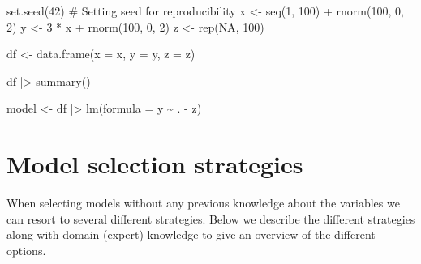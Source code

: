 \documentclass[
  letterpaper,
  DIV=11,
  numbers=noendperiod]{scrreprt}
\newenvironment{Shaded}{\begin{snugshade}}{\end{snugshade}}
\newcommand{\AttributeTok}[1]{\textcolor[rgb]{0.40,0.45,0.13}{#1}}
\newcommand{\CommentTok}[1]{\textcolor[rgb]{0.37,0.37,0.37}{#1}}
\newcommand{\ConstantTok}[1]{\textcolor[rgb]{0.56,0.35,0.01}{#1}}
\newcommand{\DecValTok}[1]{\textcolor[rgb]{0.68,0.00,0.00}{#1}}
\newcommand{\FunctionTok}[1]{\textcolor[rgb]{0.28,0.35,0.67}{#1}}
\newcommand{\NormalTok}[1]{\textcolor[rgb]{0.00,0.23,0.31}{#1}}
\newcommand{\OtherTok}[1]{\textcolor[rgb]{0.00,0.23,0.31}{#1}}
\newcommand{\SpecialCharTok}[1]{\textcolor[rgb]{0.37,0.37,0.37}{#1}}
\begin{document}
\begin{Shaded}
\begin{Highlighting}[]
\FunctionTok{set.seed}\NormalTok{(}\DecValTok{42}\NormalTok{) }\CommentTok{\# Setting seed for reproducibility}
\NormalTok{x }\OtherTok{\textless{}{-}} \FunctionTok{seq}\NormalTok{(}\DecValTok{1}\NormalTok{, }\DecValTok{100}\NormalTok{) }\SpecialCharTok{+} \FunctionTok{rnorm}\NormalTok{(}\DecValTok{100}\NormalTok{, }\DecValTok{0}\NormalTok{, }\DecValTok{2}\NormalTok{)}
\NormalTok{y }\OtherTok{\textless{}{-}} \DecValTok{3} \SpecialCharTok{*}\NormalTok{ x }\SpecialCharTok{+} \FunctionTok{rnorm}\NormalTok{(}\DecValTok{100}\NormalTok{, }\DecValTok{0}\NormalTok{, }\DecValTok{2}\NormalTok{)}
\NormalTok{z }\OtherTok{\textless{}{-}} \FunctionTok{rep}\NormalTok{(}\ConstantTok{NA}\NormalTok{, }\DecValTok{100}\NormalTok{)}

\NormalTok{df }\OtherTok{\textless{}{-}} \FunctionTok{data.frame}\NormalTok{(}\AttributeTok{x =}\NormalTok{ x, }\AttributeTok{y =}\NormalTok{ y, }\AttributeTok{z =}\NormalTok{ z)}

\NormalTok{df }\SpecialCharTok{|\textgreater{}} \FunctionTok{summary}\NormalTok{()}

\NormalTok{model }\OtherTok{\textless{}{-}}\NormalTok{ df }\SpecialCharTok{|\textgreater{}} \FunctionTok{lm}\NormalTok{(}\AttributeTok{formula =}\NormalTok{ y }\SpecialCharTok{\textasciitilde{}}\NormalTok{ . }\SpecialCharTok{{-}}\NormalTok{ z)}
\end{Highlighting}
\end{Shaded}

\section{Model selection
strategies}\label{sec-multlinreg-modelselectionstrategies}

When selecting models without any previous knowledge about the variables
we can resort to several different strategies. Below we describe the
different strategies along with domain (expert) knowledge to give an
overview of the different options.
\end{document}
